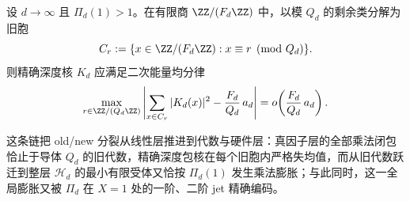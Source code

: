 \begin{conjecture}[旧胞二次能量均分]\label{conj:conclusion-fibadic-oldcell-quadratic-energy-equipartition}
设 \(d\to\infty\) 且 \(\Pi_d(1)>1\)。在有限商 \(\ZZ/(F_d\ZZ)\) 中，以模 \(Q_d\) 的剩余类分解为旧胞
\[
C_r:=\{x\in \ZZ/(F_d\ZZ): x\equiv r\pmod{Q_d}\}.
\]
则精确深度核 \(K_d\) 应满足二次能量均分律
\[
\max_{r\in \ZZ/(Q_d\ZZ)}
\left|
\sum_{x\in C_r}|K_d(x)|^2
-
\frac{F_d}{Q_d}\,a_d
\right|
=
o\!\left(\frac{F_d}{Q_d}\,a_d\right).
\]
\end{conjecture}

\noindent
这条链把 old/new 分裂从线性层推进到代数与硬件层：真因子层的全部乘法闭包恰止于导体 \(Q_d\) 的旧代数，精确深度包核在每个旧胞内严格失均值，而从旧代数跃迁到整层 \(\mathcal H_d\) 的最小有限受体又恰按 \(\Pi_d(1)\) 发生乘法膨胀；与此同时，这一全局膨胀又被 \(\Pi_d\) 在 \(X=1\) 处的一阶、二阶 jet 精确编码。
